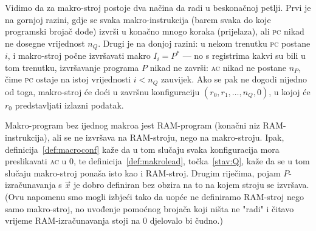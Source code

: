 Vidimo da za makro-stroj postoje dva načina da radi u beskonačnoj petlji. Prvi je na gornjoj razini, gdje se svaka makro-instrukcija (barem svaka do koje programski brojač dođe) izvrši u konačno mnogo koraka (prijelaza), ali \textsc{pc} nikad ne dosegne vrijednost $n_Q$. Drugi je na donjoj razini: u nekom trenutku \textsc{pc} postane $i$, i makro-stroj počne izvršavati makro $I_i=P^*$ --- no s registrima kakvi su bili u tom trenutku, izvršavanje programa $P$ nikad ne završi: \textsc{ac} nikad ne postane $n_P$, čime \textsc{pc} ostaje na istoj vrijednosti $i<n_Q$ zauvijek. Ako se pak ne dogodi nijedno od toga, makro-stroj će doći u završnu konfiguraciju $(r_0,r_1,\dotsc,n_Q,0)$, u kojoj će $r_0$ predstavljati izlazni podatak.

\begin{napomena}[{name=[svaki RAM-program je makro-program]}]\label{nap:rem}
Makro-program bez ijednog makroa jest RAM-program (konačni niz RAM-instrukcija), ali se ne izvršava na RAM-stroju, nego na makro-stroju. Ipak, definicija~\ref{def:macroconf} kaže da u tom slučaju svaka konfiguracija mora preslikavati \textsc{ac} u $0$, te definicija~\ref{def:makrolead}, točka~\ref{stav:Q}, kaže da se u tom slučaju makro-stroj ponaša isto kao i RAM-stroj. Drugim riječima, pojam $P$-izračunavanja s $\vec x$ je dobro definiran bez obzira na to na kojem stroju se izvršava. (Ovu napomenu smo mogli izbjeći tako da uopće ne definiramo RAM-stroj nego samo makro-stroj, no uvođenje pomoćnog brojača koji ništa ne "radi" i čitavo vrijeme RAM-izračunavanja stoji na $0$ djelovalo bi čudno.)
\end{napomena}


